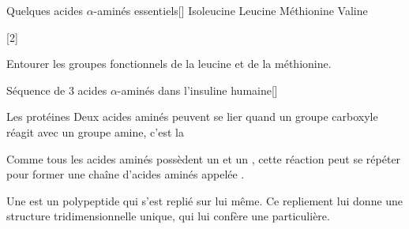 \begin{doc}{Quelques acides $\alpha$-aminés essentiels}[\label{doc:aa_essentiels}]
  \centering
  \chemname {\chemfig{!\isoleucine}} {Isoleucine}
  \chemname {\chemfig{!\leucine}}    {Leucine}
  \chemname {\chemfig{!\methionine}} {Méthionine}
  \chemname {\chemfig{!\valine}}     {Valine}
\end{doc}

[2]

\numeroQuestion Entourer les groupes fonctionnels de la leucine et de la méthionine.


\begin{doc}{Séquence de 3 acides $\alpha$-aminés dans l'insuline humaine}[\label{doc:insuline_aa}]
  \begin{center}
    
  \end{center}
\end{doc}

\begin{doc}{Les protéines}
  Deux acides aminés peuvent se lier quand un groupe carboxyle réagit avec un groupe amine, c'est la 

  \vspace*{-14pt}
  \begin{center}
  \end{center}
  \vspace*{-18pt}

  Comme tous les acides aminés possèdent un  et un , cette réaction peut se répéter pour former une chaîne d'acides aminés appelée .

  \begin{importants}
    Une  est un polypeptide qui s'est replié sur lui même.
    Ce repliement lui donne une structure tridimensionnelle unique, qui lui confère une  particulière.
  \end{importants}
  \begin{center}
  \end{center}
\end{doc}


